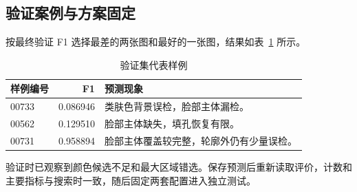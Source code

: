\begin{samepage}
\subsection{验证案例与方案固定}

按最终验证 F1 选择最差的两张图和最好的一张图，结果如表~\ref{tab:valcases} 所示。

\begin{table}[H]
\centering
\small
\caption{验证集代表样例}\label{tab:valcases}
\begin{tabular}{lrp{9.4cm}}
\toprule
样例编号 & F1 & 预测现象 \\
\midrule
00733 & 0.086946 & 类肤色背景误检，脸部主体漏检。 \\
00562 & 0.129510 & 脸部主体缺失，填孔恢复有限。 \\
00731 & 0.958894 & 脸部主体覆盖较完整，轮廓外仍有少量误检。 \\
\bottomrule
\end{tabular}
\end{table}

验证时已观察到颜色候选不足和最大区域错选。保存预测后重新读取评价，计数和主要指标与搜索时一致，随后固定两套配置进入独立测试。

\end{samepage}
